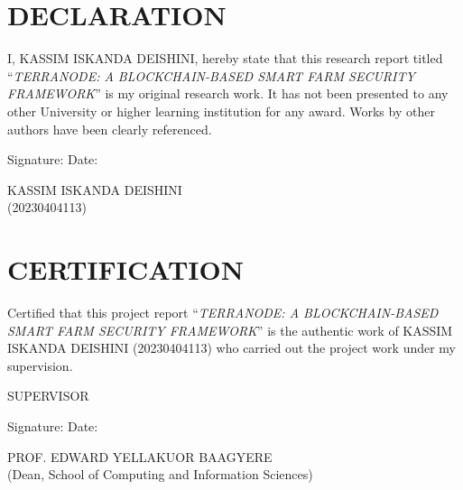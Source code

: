 \documentclass[12pt,a4paper]{report}
\begin{document}

\chapter*{DECLARATION}

\onehalfspacing

I, KASSIM ISKANDA DEISHINI, hereby state that this research report titled ``\textit{TERRANODE: A BLOCKCHAIN-BASED SMART FARM SECURITY FRAMEWORK}'' is my original research work. It has not been presented to any other University or higher learning institution for any award. Works by other authors have been clearly referenced.

\vspace{2cm}

\noindent
Signature: \makebox[2in]{\dotfill} \hspace{1cm} Date: \makebox[2in]{\dotfill}

\vspace{0.5cm}

\noindent
KASSIM ISKANDA DEISHINI\\
(20230404113)

\chapter*{CERTIFICATION}

\onehalfspacing

Certified that this project report ``\textit{TERRANODE: A BLOCKCHAIN-BASED SMART FARM SECURITY FRAMEWORK}'' is the authentic work of KASSIM ISKANDA DEISHINI (20230404113) who carried out the project work under my supervision.

\vspace{1.2cm}

\noindent
SUPERVISOR

\vspace{0.6cm}

\noindent
Signature: \makebox[2in]{\dotfill} \hspace{1cm} Date: \makebox[2in]{\dotfill}

\vspace{0.3cm}

\noindent
PROF. EDWARD YELLAKUOR BAAGYERE\\
(Dean, School of Computing and Information Sciences)
\end{document}
